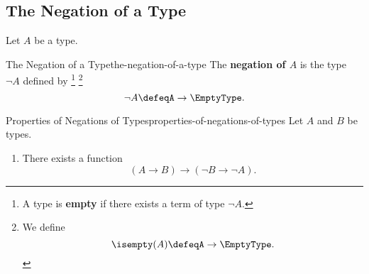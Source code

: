 \subsection{The Negation of a Type}\label{subsection-the-negation-of-a-type}
Let $A$ be a type.
\begin{definition}{The Negation of a Type}{the-negation-of-a-type}%
    The \textbf{negation of $A$} is the type $\neg A$ defined by%
    \footnote{%
        A type is \textbf{empty} if there exists a term of type $\neg A$.
    }%
    \footnote{%
        We define
        \[
            \isempty(A)%
            \defeq%
            A%
            \to%
            \EmptyType.%
        \]%
        \par\vspace*{\TCBBoxCorrection}
    }%
    \[
        \neg A%
        \defeq%
        A\to\EmptyType.%
    \]%
\end{definition}
\begin{proposition}{Properties of Negations of Types}{properties-of-negations-of-types}%
    Let $A$ and $B$ be types.
    \begin{enumerate}
        \item\label{properties-of-negations-of-types-contrapositive}There exists a function
            \[
                (A\to B)%
                \to
                (\neg B\to\neg A).%
            \]%
    \end{enumerate}
\end{proposition}
